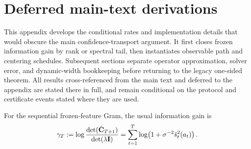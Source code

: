 \section{Deferred main-text derivations}\label{app:deferred}
This appendix develops the conditional rates and implementation details that
would obscure the main confidence-transport argument.  It first closes frozen
information gain by rank or spectral tail, then instantiates observable path
and centering schedules.  Subsequent sections separate operator approximation,
solver error, and dynamic-width bookkeeping before returning to the legacy
one-sided theorem.  All results cross-referenced from the main text and deferred
to the appendix are stated there in full, and remain conditional on the protocol
and certificate events stated where they are used.

For the sequential frozen-feature Gram, the usual information gain is
\begin{equation}\label{eq:infogain}
\gamma_T:=\log\frac{\det(\bar{\mathbf{C}}_{T+1})}{\det(\lambda\mathbf{I})}
=\sum_{t=1}^T\log\!\left(1+\sigma^{-2}\bar s_t^2(a_t)\right).
\end{equation}

